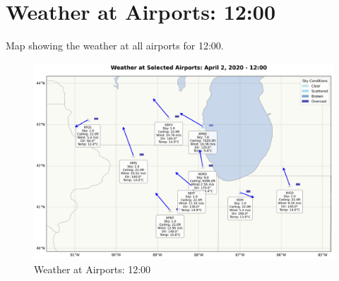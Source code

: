 \section{Weather at Airports: 12:00}
Map showing the weather at all airports for 12:00.
\begin{figure}[htbp]
\centering
\includegraphics[width=0.7	extwidth]{weather_map_12_00.png}
\caption{Weather at Airports: 12:00}
\label{fig:weather_map_12_00}
\end{figure}
